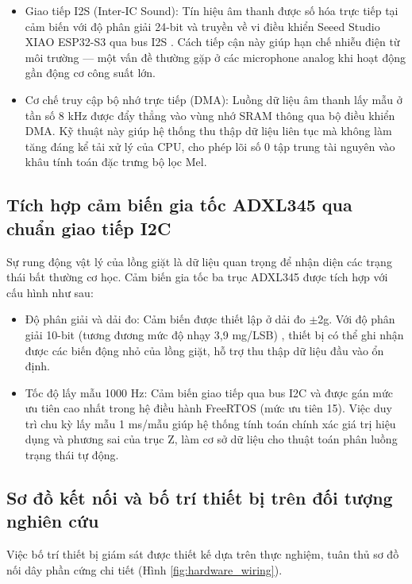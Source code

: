 \begin{itemize}
    \item Giao tiếp I2S (Inter-IC Sound): Tín hiệu âm thanh được số hóa trực tiếp tại cảm biến với độ phân giải 24-bit và truyền về vi điều khiển Seeed Studio XIAO ESP32-S3 qua bus I2S \cite{ref_2_inmp441}. Cách tiếp cận này giúp hạn chế nhiễu điện từ môi trường — một vấn đề thường gặp ở các microphone analog khi hoạt động gần động cơ công suất lớn.
    \item Cơ chế truy cập bộ nhớ trực tiếp (DMA): Luồng dữ liệu âm thanh lấy mẫu ở tần số 8 kHz được đẩy thẳng vào vùng nhớ SRAM thông qua bộ điều khiển DMA. Kỹ thuật này giúp hệ thống thu thập dữ liệu liên tục mà không làm tăng đáng kể tải xử lý của CPU, cho phép lõi số 0 tập trung tài nguyên vào khâu tính toán đặc trưng bộ lọc Mel.
\end{itemize}

\subsection{Tích hợp cảm biến gia tốc ADXL345 qua chuẩn giao tiếp I2C}

Sự rung động vật lý của lồng giặt là dữ liệu quan trọng để nhận diện các trạng thái bất thường cơ học. Cảm biến gia tốc ba trục ADXL345 được tích hợp với cấu hình như sau:

\begin{itemize}
    \item Độ phân giải và dải đo: Cảm biến được thiết lập ở dải đo $\pm$2g. Với độ phân giải 10-bit (tương đương mức độ nhạy 3,9 mg/LSB) \cite{ref_2_adxl345}, thiết bị có thể ghi nhận được các biến động nhỏ của lồng giặt, hỗ trợ thu thập dữ liệu đầu vào ổn định.
    \item Tốc độ lấy mẫu 1000 Hz: Cảm biến giao tiếp qua bus I2C và được gán mức ưu tiên cao nhất trong hệ điều hành FreeRTOS (mức ưu tiên 15). Việc duy trì chu kỳ lấy mẫu 1 ms/mẫu giúp hệ thống tính toán chính xác giá trị hiệu dụng và phương sai của trục Z, làm cơ sở dữ liệu cho thuật toán phân luồng trạng thái tự động.
\end{itemize}

\subsection{Sơ đồ kết nối và bố trí thiết bị trên đối tượng nghiên cứu}

Việc bố trí thiết bị giám sát được thiết kế dựa trên thực nghiệm, tuân thủ sơ đồ nối dây phần cứng chi tiết (Hình \ref{fig:hardware_wiring}).

